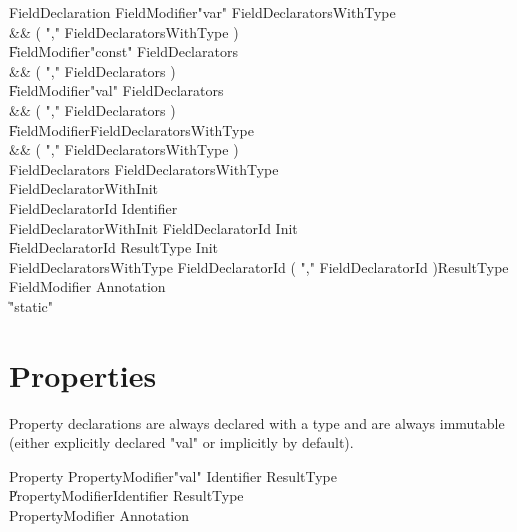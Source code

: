 \begin{grammar}
FieldDeclaration
        \: FieldModifier\star \xcd"var" FieldDeclaratorsWithType \\&& ( \xcd"," FieldDeclaratorsWithType )\star \\
        \| FieldModifier\star \xcd"const" FieldDeclarators \\&& ( \xcd"," FieldDeclarators )\star \\
        \| FieldModifier\star \xcd"val" FieldDeclarators \\&& ( \xcd"," FieldDeclarators )\star \\
        \| FieldModifier\star FieldDeclaratorsWithType \\&& ( \xcd"," FieldDeclaratorsWithType )\star \\
FieldDeclarators
        \: FieldDeclaratorsWithType \\
        \: FieldDeclaratorWithInit \\
FieldDeclaratorId
        \: Identifier  \\
FieldDeclaratorWithInit
        \: FieldDeclaratorId Init \\
        \| FieldDeclaratorId ResultType Init \\
FieldDeclaratorsWithType
        \: FieldDeclaratorId ( \xcd"," FieldDeclaratorId )\star ResultType \\
FieldModifier \: Annotation \\
                \| \xcd"static" \\
\end{grammar}



\section{Properties}
Property declarations are always declared with a type and are
always immutable (either explicitly declared \xcd"val" or implicitly by default).

\begin{grammar}
Property
        \: PropertyModifier\star \xcd"val" Identifier ResultType \\
        \| PropertyModifier\star Identifier ResultType \\
PropertyModifier \: Annotation \\
\end{grammar}
